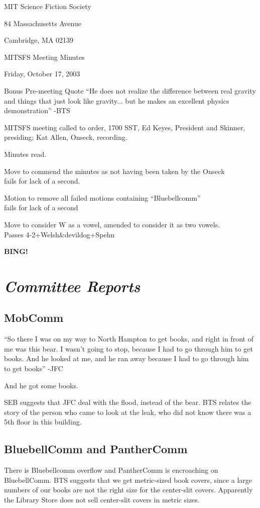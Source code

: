 \documentclass[10pt]{article}
\newcommand{\bing}{{\bf BING!} }
\newcommand{\goto}[1]{\bing \vskip 12pt \section*{{\em{#1}}}}
\begin{document}
\begin{center}

MIT Science Fiction Society 

84 Massachusetts Avenue

Cambridge, MA 02139

\vspace{12pt}

MITSFS Meeting Minutes 

Friday, October 17, 2003

\end{center}
 
\vspace{18pt}

\setlength{\parskip}{6pt}

\noindent
Bonus Pre-meeting Quote ``He does not realize the difference between
real gravity and things that just look like gravity... but he makes an
excellent physics demonstration'' -BTS

MITSFS meeting called to order, 1700 SST, Ed Keyes, President and
Skinner, presiding; Kat Allen,  Onseck, recording.

Minutes read.

Move to commend the minutes as not having been taken by the Onseck\\
fails for lack of a second.

Motion to remove all failed motions containing ``Bluebellcomm''\\
fails for lack of a second

Move to consider W as a vowel, amended to consider it as two vowels.\\
Passes 4-2+Welsh&devildog+Spehn


\goto{Committee Reports}
\subsection*{MobComm}
``So there I was on my way to North Hampton to get books, and right in
front of me was this bear.  I wasn't going to stop, because I had to
go through him to get books. And he looked at me, and he ran away
because I had to go through him to get books'' -JFC

And he got some books.

SEB suggests that JFC deal with the flood, instead of the bear.
BTS relates the story of the person who came to look at the leak, who
did not know there was a 5th floor in this building.


\subsection*{BluebellComm and PantherComm}
There is Bluebellcomm overflow and PantherComm is encroaching on BluebellComm.
BTS suggests that we get metric-sized book covers, since a large
numbers of our books are not the right size for the center-slit
covers. Apparently the Library Store does not sell center-slit covers in metric sizes.
\end{document}

